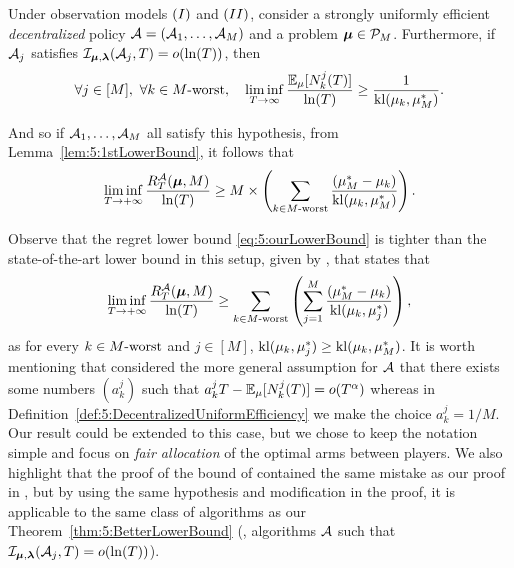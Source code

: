 \begin{theorem}\label{thm:5:BetterLowerBound}
\begin{leftbar}[theorembar]  %
  Under observation models $(I)$ and $(II)$, consider a strongly uniformly efficient \emph{decentralized} policy $\mathcal{A}=(\mathcal{A}_1,\dots,\mathcal{A}_M)$ and a problem $\boldsymbol{\mu}\in\mathcal{P}_M$.
  Furthermore, if $\mathcal{A}_j$ satisfies $\mathcal{I}_{\bm{\mu},\bm{\lambda}}(\mathcal{A}_j,T) = \mathop{}\mathopen{}o\mathopen{}\left(\ln(T)\right)$, then
  \begin{equation}\label{eq:5:LBDraws}
    \forall j \in [M], \ \forall k \in M\text{-}\mathrm{worst}, \ \ \ \liminf_{T\to \infty} \frac{\mathbb{E}_{\mu}[N_k^j(T)]}{\ln(T)} \geq \frac{1}{\mathrm{kl}(\mu_k, \mu_M^*)}.
  \end{equation}

  \noindent And so if $\mathcal{A}_1,\dots,\mathcal{A}_M$ all satisfy this hypothesis, from Lemma~\ref{lem:5:1stLowerBound}, it follows that
  \begin{equation}\label{eq:5:ourLowerBound}
    \mathop{\lim\inf}\limits_{T \to +\infty} \frac{R_T^{\mathcal{A}}(\boldsymbol{\mu}, M)}{\ln(T)}
    \geq M \times \left( \sum_{k \in M\text{-}\mathrm{worst}} \frac{(\mu_M^* -  \mu_k)}{\mathrm{kl}(\mu_k, \mu_M^*)} \right) .
  \end{equation}
\end{leftbar}  %
\end{theorem}


Observe that the regret lower bound \eqref{eq:5:ourLowerBound} is tighter than the state-of-the-art lower bound in this setup, given by \cite{Zhao10}, that states that
\begin{equation}\label{eq:5:Zhao10LowerBound}
  \mathop{\lim\inf}\limits_{T \to +\infty} \frac{R_T^{\mathcal{A}}(\boldsymbol{\mu}, M)}{\ln(T)}
  \geq \sum_{k \in M\text{-}\mathrm{worst}} \left( \sum_{j=1}^{M} \frac{(\mu_M^* -  \mu_k)}{\mathrm{kl}(\mu_k, \mu_{j}^*)} \right),
\end{equation}
as for every $k \in M\text{-}\mathrm{worst}$ and $j \in [M]$, $\mathrm{kl}(\mu_k, \mu_j^*) \geq \mathrm{kl}(\mu_k, \mu_M^*)$.
%
It is worth mentioning that \cite{Zhao10} considered the more general assumption for $\mathcal{A}$ that there exists some numbers $(a_{k}^j)$ such that $a_{k}^j T - \mathbb{E}_{\mu}[N_k^j(T)] = o(T^\alpha)$ whereas in Definition~\ref{def:5:DecentralizedUniformEfficiency} we make the choice $a_{k}^j = 1/M$.
Our result could be extended to this case, but we chose to keep the notation simple and focus on \emph{fair allocation} of the optimal arms between players.
%
We also highlight that the proof of the bound of \cite{Zhao10} contained the same mistake as our proof in \cite{Besson2018ALT}, but by using the same hypothesis and modification in the proof, it is applicable to the same class of algorithms as our Theorem~\ref{thm:5:BetterLowerBound} (\ie, algorithms $\mathcal{A}$ such that $\mathcal{I}_{\bm{\mu},\bm{\lambda}}(\mathcal{A}_j,T) = \mathop{}\mathopen{}o\mathopen{}\left(\ln(T)\right)$).


